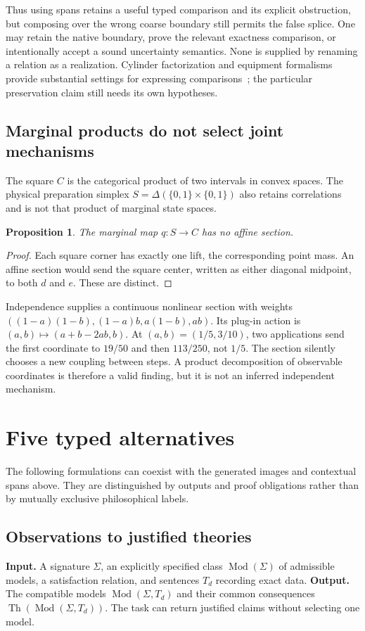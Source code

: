\documentclass[11pt]{article}
\newtheorem{proposition}[theorem]{Proposition}
\theoremstyle{definition}
\newcommand{\Mod}{\operatorname{Mod}}
\newcommand{\Th}{\operatorname{Th}}
\begin{document}
Thus using spans retains a useful typed comparison and its explicit obstruction, but composing over the wrong coarse boundary still permits the false splice. One may retain the native boundary, prove the relevant exactness comparison, or intentionally accept a sound uncertainty semantics. None is supplied by renaming a relation as a realization. Cylinder factorization and equipment formalisms provide substantial settings for expressing comparisons~\cite{Garner,CruttwellShulman}; the particular preservation claim still needs its own hypotheses.

\subsection{Marginal products do not select joint mechanisms}
The square $C$ is the categorical product of two intervals in convex spaces. The physical preparation simplex $S=\Delta(\{0,1\}\times\{0,1\})$ also retains correlations and is not that product of marginal state spaces.

\begin{proposition}\label{prop:section}
The marginal map $q:S\to C$ has no affine section.
\end{proposition}
\begin{proof}
Each square corner has exactly one lift, the corresponding point mass. An affine section would send the square center, written as either diagonal midpoint, to both $d$ and $e$. These are distinct.
\end{proof}
Independence supplies a continuous nonlinear section with weights
$((1-a)(1-b),(1-a)b,a(1-b),ab)$. Its plug-in action is
$(a,b)\mapsto(a+b-2ab,b)$. At $(a,b)=(1/5,3/10)$, two applications send the first coordinate to $19/50$ and then $113/250$, not $1/5$. The section silently chooses a new coupling between steps. A product decomposition of observable coordinates is therefore a valid finding, but it is not an inferred independent mechanism.

\section{Five typed alternatives}
\label{sec:five}
The following formulations can coexist with the generated images and contextual spans above. They are distinguished by outputs and proof obligations rather than by mutually exclusive philosophical labels.

\subsection{Observations to justified theories}
\textbf{Input.} A signature $\Sigma$, an explicitly specified class $\Mod(\Sigma)$ of admissible models, a satisfaction relation, and sentences $T_d$ recording exact data. \textbf{Output.} The compatible models $\Mod(\Sigma,T_d)$ and their common consequences $\Th(\Mod(\Sigma,T_d))$. The task can return justified claims without selecting one model.
\end{document}
